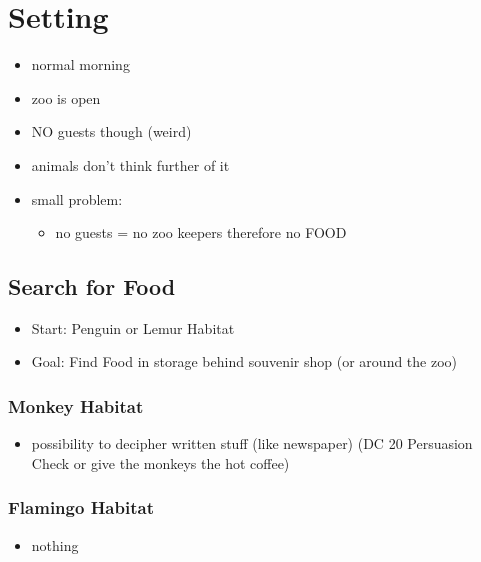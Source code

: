 \chapter{Setting}
\begin{itemize}
	\item normal morning
	\item zoo is open
	\item NO guests though (weird)
	\item animals don't think further of it
	\item small problem:
	\begin{itemize}
		\item no guests = no zoo keepers therefore no FOOD
	\end{itemize}
\end{itemize}

\section*{Search for Food}
\begin{itemize}
	\item Start: Penguin or Lemur Habitat
	\item Goal: Find Food in storage behind souvenir shop (or around the zoo)
\end{itemize}
\subsection*{ Monkey Habitat}
\begin{itemize}
	\item possibility to decipher written stuff (like newspaper) (DC 20 Persuasion Check or give the monkeys the hot coffee)
\end{itemize}
\subsection*{ Flamingo Habitat}
\begin{itemize}
	\item nothing
\end{itemize}
